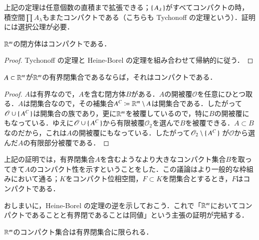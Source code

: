 \begin{que}[*]
上記の定理は任意個数の直積まで拡張できる；$\set{A_\lambda}$がすべてコンパクトの時，積空間$\prod A_\lambda$もまたコンパクトである（こちらも Tychonoff の定理という）．証明には選択公理が必要．
\end{que}

\begin{cor}
$\mathbb{R}^m$の閉方体はコンパクトである．
\end{cor}

\begin{proof}Tychonoff の定理と Heine-Borel の定理を組み合わせて帰納的に従う．\end{proof}

\begin{cor}
$A \subset \mathbb{R}^m$が$\mathbb{R}^m$の有界閉集合であるならば，それはコンパクトである．
\end{cor}

\begin{proof}$A$は有界なので，$A$を含む閉方体$B$がある．$A$の開被覆$\mathscr{O}$を任意にひとつ取る．$A$は閉集合なので，その補集合$A^C \coloneqq \mathbb{R}^m \setminus A$は開集合である．したがって$\mathscr{O} \cup \set{A^C}$は開集合の族であり，更に$\mathbb{R}^m$を被覆しているので，特に$B$の開被覆にもなっている．ゆえに$\mathscr{O} \cup \set{A^C}$から有限被覆$\mathscr{O}_2$を選んで$B$を被覆できる．$A \subset B$なのだから，これは$A$の開被覆にもなっている．したがって$\mathscr{O}_2 \setminus \set{A^C}$ が$\mathscr{O}$から選んだ$A$の有限部分被覆である．  \end{proof}

\begin{que}[*]
上記の証明では，有界閉集合$A$を含むようなより大きなコンパクト集合$B$を取ってきて$A$のコンパクト性を示すということをした．この議論はより一般的な枠組みにおいて通る；$K$をコンパクト位相空間，$F \subset K$を閉集合とするとき，$F$はコンパクトである．
\end{que}

おしまいに，Heine-Borel の定理の逆を示しておこう．これで「$\mathbb{R}^m$においてコンパクトであることと有界閉であることは同値」という主張の証明が完結する．

\begin{thm}
$\mathbb{R}^m$のコンパクト集合は有界閉集合に限られる．
\end{thm}

